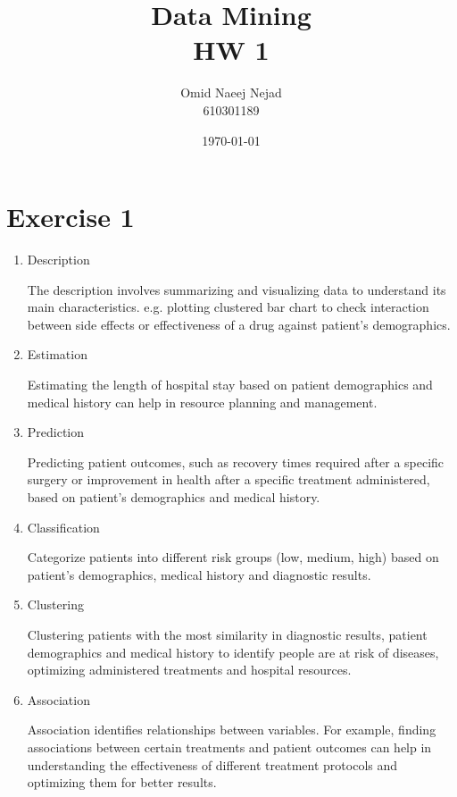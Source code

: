 \documentclass[12pt]{article}
\title{Data Mining \\ HW 1}
\date{\today}
\author{Omid Naeej Nejad \\ 610301189}
\begin{document}
	\maketitle
	\section{Exercise 1}
		\begin{enumerate}
			\item Description
			
			The description involves summarizing and visualizing data to understand its main characteristics. e.g. plotting clustered bar chart to check interaction between side effects or effectiveness of a drug against patient's demographics.
			
			\item Estimation
			
			Estimating the length of hospital stay based on patient demographics and medical history can help in resource planning and management.
			
			\item Prediction
			
			Predicting patient outcomes, such as recovery times required after a specific surgery or improvement in health after a specific treatment administered, based on patient's demographics and medical history.
			
			\item Classification
			
			Categorize patients into different risk groups (low, medium, high) based on patient's demographics, medical history and diagnostic results. 
			
			\item Clustering
			
			Clustering patients with the most similarity in diagnostic results, patient demographics and medical history to identify people are at risk of diseases, optimizing administered treatments and hospital resources.
			
			\item Association
			
			Association identifies relationships between variables. For example, finding associations
			between certain treatments and patient outcomes can help in understanding the effectiveness of
			different treatment protocols and optimizing them for better results.

		\end{enumerate}
	
\end{document}

